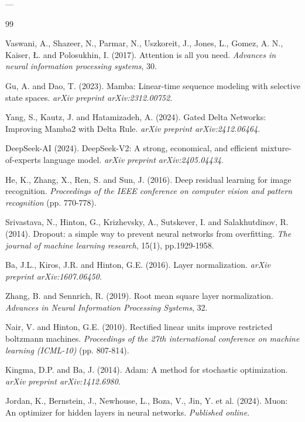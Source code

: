 \documentclass[11pt]{article}
\begin{document}
	---
	
	
	\begin{thebibliography}{99}
		
		Vaswani, A., Shazeer, N., Parmar, N., Uszkoreit, J., Jones, L., Gomez, A. N., Kaiser, \L{}. and Polosukhin, I. (2017).
		Attention is all you need.
		\textit{Advances in neural information processing systems}, 30.
		
		Gu, A. and Dao, T. (2023).
		Mamba: Linear-time sequence modeling with selective state spaces.
		\textit{arXiv preprint arXiv:2312.00752}.
		
		Yang, S., Kautz, J. and Hatamizadeh, A. (2024).
		Gated Delta Networks: Improving Mamba2 with Delta Rule.
		\textit{arXiv preprint arXiv:2412.06464}.
		
		DeepSeek-AI (2024).
		DeepSeek-V2: A strong, economical, and efficient mixture-of-experts language model.
		\textit{arXiv preprint arXiv:2405.04434}.
		
		He, K., Zhang, X., Ren, S. and Sun, J. (2016).
		Deep residual learning for image recognition.
		\textit{Proceedings of the IEEE conference on computer vision and pattern recognition} (pp. 770-778).
		
		Srivastava, N., Hinton, G., Krizhevsky, A., Sutskever, I. and Salakhutdinov, R. (2014).
		Dropout: a simple way to prevent neural networks from overfitting.
		\textit{The journal of machine learning research}, 15(1), pp.1929-1958.
		
		Ba, J.L., Kiros, J.R. and Hinton, G.E. (2016).
		Layer normalization.
		\textit{arXiv preprint arXiv:1607.06450}.
		
		Zhang, B. and Sennrich, R. (2019).
		Root mean square layer normalization.
		\textit{Advances in Neural Information Processing Systems}, 32.
		
		Nair, V. and Hinton, G.E. (2010).
		Rectified linear units improve restricted boltzmann machines.
		\textit{Proceedings of the 27th international conference on machine learning (ICML-10)} (pp. 807-814).
		
		Kingma, D.P. and Ba, J. (2014).
		Adam: A method for stochastic optimization.
		\textit{arXiv preprint arXiv:1412.6980}.
		
		Jordan, K., Bernstein, J., Newhouse, L., Boza, V., Jin, Y. et al. (2024).
		Muon: An optimizer for hidden layers in neural networks.
		\textit{Published online}.
		

\end{thebibliography}
\end{document}
